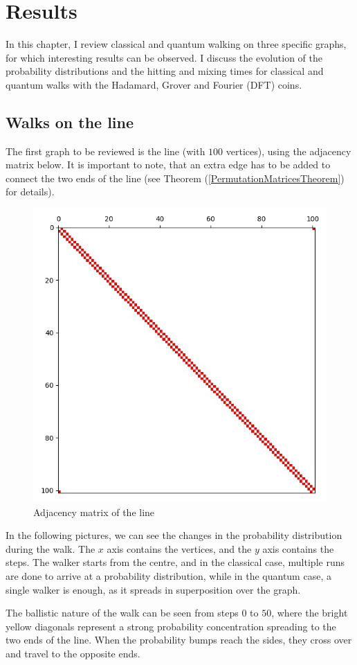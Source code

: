 \chapter{Results}

In this chapter, I review classical and quantum walking on three specific graphs, for which interesting results can be observed. I discuss the evolution of the probability distributions and the hitting and mixing times for classical and quantum walks with the Hadamard, Grover and Fourier (DFT) coins.

\section{Walks on the line}

The first graph to be reviewed is the line (with $100$ vertices), using the adjacency matrix below. It is important to note, that an extra edge has to be added to connect the two ends of the line (see Theorem (\ref{PermutationMatricesTheorem}) for details).

\begin{figure}[H]
\centering
\includegraphics[width=0.5\linewidth]{./figures/results/path/graph.jpg}
\caption{Adjacency matrix of the line}
\end{figure}

In the following pictures, we can see the changes in the probability distribution during the walk. The $x$ axis contains the vertices, and the $y$ axis contains the steps. The walker starts from the centre, and in the classical case, multiple runs are done to arrive at a probability distribution, while in the quantum case, a single walker is enough, as it spreads in superposition over the graph.

The ballistic nature of the walk can be seen from steps $0$ to $50$, where the bright yellow diagonals represent a strong probability concentration spreading to the two ends of the line. When the probability bumps reach the sides, they cross over and travel to the opposite ends.

